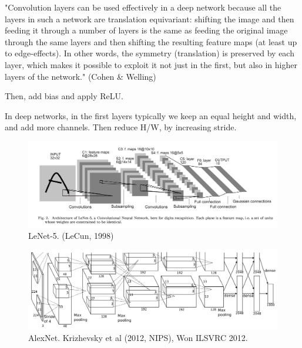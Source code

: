 \documentclass[english]{article}
\begin{document}
"Convolution layers can be used effectively in a deep network because all the layers in such a network are translation equivariant: shifting the image and then feeding
it through a number of layers is the same as feeding the
original image through the same layers and then shifting
the resulting feature maps (at least up to edge-effects). In
other words, the symmetry (translation) is preserved by
each layer, which makes it possible to exploit it not just
in the first, but also in higher layers of the network." (Cohen \& Welling)


\item Then, add bias and apply ReLU. 
 
In deep networks, in the first layers typically we keep an equal height and width, and add more channels. Then reduce H/W, by increasing stride. %

\begin{figure}
  \centering
  \includegraphics[scale=0.3]{lenet.png}
  \caption{LeNet-5. (LeCun, 1998)}
  \label{lenet5}
\end{figure}


\begin{figure}
  \centering
  \includegraphics[scale=0.75]{a.png}
  \caption{AlexNet. Krizhevsky et al (2012, NIPS), Won ILSVRC 2012.}
  \label{AlexNet}
\end{figure}
\end{document}
